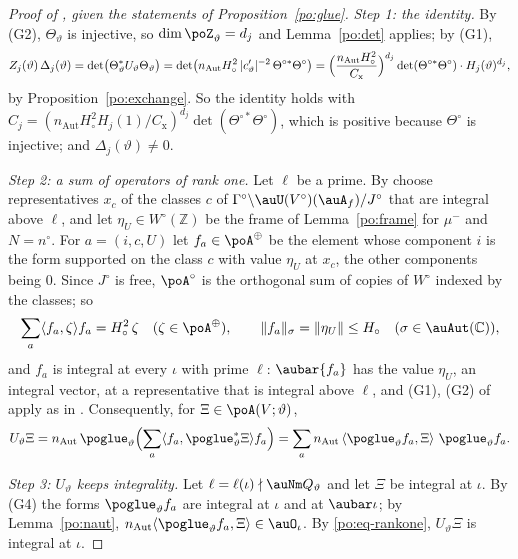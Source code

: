 \documentclass[10pt]{amsart}
\theoremstyle{definition}
\theoremstyle{remark}
\newcommand{\C}{\mathbb C}
\newcommand{\Z}{\mathbb Z}
\begin{document}
\begin{proof}[Proof of {\cite[Proposition~14.41]{P46}}, given the statements of Proposition~\ref{po:glue}]
\emph{Step 1: the identity.} By (G2), $\Theta_\vartheta$ is injective, so $\dim\poZ_\vartheta=d_j$
and Lemma~\ref{po:det} applies; by (G1),
\[
Z_j(\vartheta)\,\Delta_j(\vartheta)=\det\bigl(\Theta_\vartheta^*U_\vartheta\Theta_\vartheta\bigr)=
\det\bigl(n_{\mathrm{Aut}}H_\circ^2\,|c'_\vartheta|^{-2}\,\Theta^{\circ*}\Theta^\circ\bigr)=
\Bigl(\frac{n_{\mathrm{Aut}}H_\circ^2}{C_{\mathrm x}}\Bigr)^{d_j}\det(\Theta^{\circ*}\Theta^\circ)
\cdot H_j(\vartheta)^{d_j},
\]
by Proposition~\ref{po:exchange}. So the identity holds with $C_j=(n_{\mathrm{Aut}}H_\circ^2H_j(1)
/C_{\mathrm x})^{d_j}\det(\Theta^{\circ*}\Theta^\circ)$, which is positive because $\Theta^\circ$
is injective; and $\Delta_j(\vartheta)\ne0$.

\emph{Step 2: a sum of operators of rank one.} Let $\ell$ be a prime. By
{\cite[Corollary~6.4(a)]{P49}} choose representatives $x_c$ of the classes $c$ of
$\Gamma^\circ\backslash\auU(V^\circ)(\auA_f)/J^\circ$ that are integral above $\ell$, and let
$\eta_U\in W^\circ(\Z)$ be the frame of Lemma~\ref{po:frame} for $\mu^-$ and $N=n^\circ$. For
$a=(i,c,U)$ let $f_a\in\poA^\oplus$ be the element whose component $i$ is the form supported on
the class $c$ with value $\eta_U$ at $x_c$, the other components being $0$. Since $J^\circ$ is
free, $\poA^\circ$ is the orthogonal sum of copies of $W^\circ$ indexed by the classes; so
\[
\sum_a\langle f_a,\zeta\rangle f_a=H_\circ^2\,\zeta\quad(\zeta\in\poA^\oplus),\qquad
\|f_a\|_\sigma=\|\eta_U\|\le H_\circ\quad(\sigma\in\auAut(\C)),
\]
and $f_a$ is integral at every $\iota$ with prime $\ell$: $\aubar{f_a}$ has the value $\eta_U$, an
integral vector, at a representative that is integral above $\ell$, and (G1), (G2) of
{\cite[\S6.1]{P49}} apply as in {\cite[Corollary~6.4(b)]{P49}}. Consequently, for $\Xi\in\poA(V;
\vartheta)$,
\begin{equation}\label{po:eq-rankone}
U_\vartheta\Xi=n_{\mathrm{Aut}}\,\poglue_\vartheta\Bigl(\sum_a\langle f_a,\poglue_\vartheta^*\Xi
\rangle f_a\Bigr)=\sum_an_{\mathrm{Aut}}\,\langle\poglue_\vartheta f_a,\Xi\rangle\ \poglue_\vartheta
f_a .
\end{equation}

\emph{Step 3: $U_\vartheta$ keeps integrality.} Let $\ell=\ell(\iota)\nmid\auNm Q_\vartheta$ and
let $\Xi$ be integral at $\iota$. By (G4) the forms $\poglue_\vartheta f_a$ are integral at $\iota$
and at $\aubar\iota$; by Lemma~\ref{po:naut}, $n_{\mathrm{Aut}}\langle\poglue_\vartheta f_a,\Xi
\rangle\in\auO_\iota$. By \eqref{po:eq-rankone}, $U_\vartheta\Xi$ is integral at $\iota$.


\end{proof}
\end{document}
